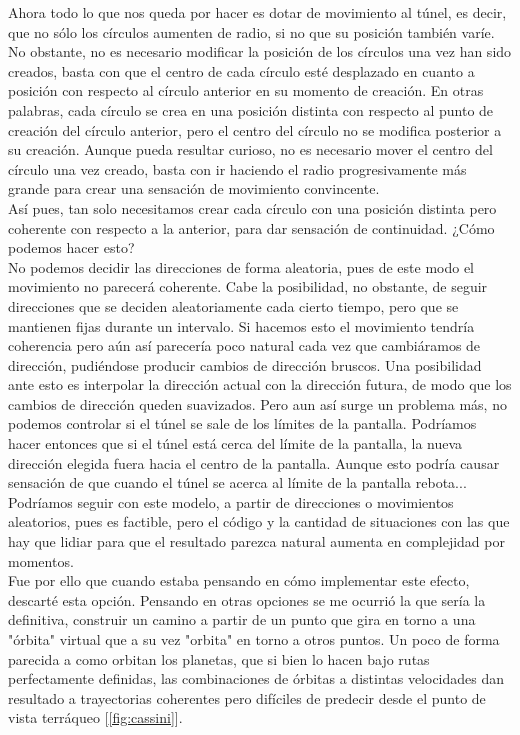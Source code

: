 Ahora todo lo que nos queda por hacer es dotar de movimiento al túnel, es decir, que no sólo los círculos aumenten de radio, si no que su posición también varíe. No obstante, no es necesario modificar la posición de los círculos una vez han sido creados, basta con que el centro de cada círculo esté desplazado en cuanto a posición con respecto al círculo anterior en su momento de creación. En otras palabras, cada círculo se crea en una posición distinta con respecto al punto de creación del círculo anterior, pero el centro del círculo no se modifica posterior a su creación. Aunque pueda resultar curioso, no es necesario mover el centro del círculo una vez creado, basta con ir haciendo el radio progresivamente más grande para crear una sensación de movimiento convincente.\\

Así pues, tan solo necesitamos crear cada círculo con una posición distinta pero coherente con respecto a la anterior, para dar sensación de continuidad. ¿Cómo podemos hacer esto?\\

No podemos decidir las direcciones de forma aleatoria, pues de este modo el movimiento no parecerá coherente. Cabe la posibilidad, no obstante, de seguir direcciones que se deciden aleatoriamente cada cierto tiempo, pero que se mantienen fijas durante un intervalo. Si hacemos esto el movimiento tendría coherencia pero aún así parecería poco natural cada vez que cambiáramos de dirección, pudiéndose producir cambios de dirección bruscos. Una posibilidad ante esto es interpolar la dirección actual con la dirección futura, de modo que los cambios de dirección queden suavizados. Pero aun así surge un problema más, no podemos controlar si el túnel se sale de los límites de la pantalla. Podríamos hacer entonces que si el túnel está cerca del límite de la pantalla, la nueva dirección elegida fuera hacia el centro de la pantalla. Aunque esto podría causar sensación de que cuando el túnel se acerca al límite de la pantalla rebota... Podríamos seguir con este modelo, a partir de direcciones o movimientos aleatorios, pues es factible, pero el código y la cantidad de situaciones con las que hay que lidiar para que el resultado parezca natural aumenta en  complejidad por momentos.\\

Fue por ello que cuando estaba pensando en cómo implementar este efecto, descarté esta opción. Pensando en otras opciones se me ocurrió la que sería la definitiva, construir un camino a partir de un punto que gira en torno a una "órbita" virtual que a su vez "orbita" en torno a otros puntos. Un poco de forma parecida a como orbitan los planetas, que si bien lo hacen bajo rutas perfectamente definidas, las combinaciones de órbitas a distintas velocidades dan resultado a trayectorias coherentes pero difíciles de predecir desde el punto de vista terráqueo [\ref{fig:cassini}].\\

